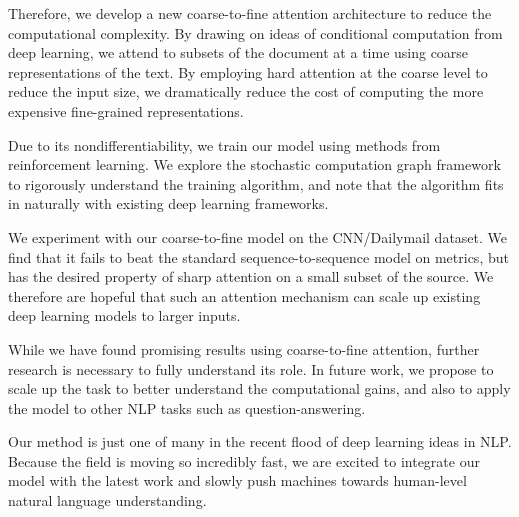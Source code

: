 \documentclass[12pt]{report}
\begin{document}
Therefore, we develop a new coarse-to-fine attention architecture to reduce the computational complexity. By drawing on ideas of conditional computation from deep learning, we attend to subsets of the document at a time using coarse representations of the text.
By employing hard attention at the coarse level to reduce the input size, we dramatically reduce the cost of computing the more expensive fine-grained representations.

Due to its nondifferentiability, we train our model using methods from reinforcement learning. We explore the stochastic computation graph framework to rigorously understand the training algorithm, and note that the algorithm fits in naturally with existing deep learning frameworks.

We experiment with our coarse-to-fine model on the CNN/Dailymail dataset. We find that it fails to beat the standard sequence-to-sequence model on metrics, but has the desired property of sharp attention on a small subset of the source. We therefore are hopeful that such an attention mechanism can scale up existing deep learning models to larger inputs.

While we have found promising results using coarse-to-fine attention, further research is necessary to fully understand its role. In future work, we propose to scale up the task to better understand the computational gains, and also to apply the model to other NLP tasks such as question-answering.

Our method is just one of many in the recent flood of deep learning ideas in NLP.
Because the field is moving so incredibly fast, we are excited to integrate our model with the latest work and slowly push machines towards human-level natural language understanding.



\end{document}
